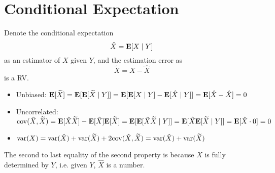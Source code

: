 \section{Conditional Expectation}
\begin{theorem}
    Denote the conditional expectation
    \begin{equation}
        \hat{X} = \mathbf{E}[X \mid Y]
    \end{equation}
    as an estimator of $X$ given $Y$, and the estimation error as 
    \begin{equation}
        \widetilde{X} = X - \hat{X}
    \end{equation}
    is a RV.
\end{theorem}
\begin{property}
    \begin{itemize}
        \item Unbiased: $\mathbf{E}[\widetilde{X}] = \mathbf{E}[\mathbf{E}[\widetilde{X} \mid Y]] = \mathbf{E}[\mathbf{E}[X \mid Y] - \mathbf{E}[\hat{X} \mid Y]] = \mathbf{E}[\hat{X} - \hat{X}] = 0$
        \item Uncorrelated: $\mathrm{cov}(\hat{X}, \widetilde{X}) = \mathbf{E}[\hat{X}\widetilde{X}] - \mathbf{E}[\hat{X}]\mathbf{E}[\widetilde{X}] = \mathbf{E}[\mathbf{E}[\hat{X}\widetilde{X} \mid Y]] = \mathbf{E}[\hat{X}\mathbf{E}[\widetilde{X} \mid Y]] = \mathbf{E}[\hat{X} \cdot 0] = 0$
        \item $\mathrm{var}(X) = \mathrm{var}(\hat{X}) + \mathrm{var}(\widetilde{X}) + 2\mathrm{cov}(\hat{X}, \widetilde{X}) = \mathrm{var}(\hat{X}) + \mathrm{var}(\widetilde{X})$
    \end{itemize}
    The second to last equality of the second property is because $\hat{X}$ is fully determined by $Y$, i.e. given $Y$, $\hat{X}$ is a number.
\end{property}

